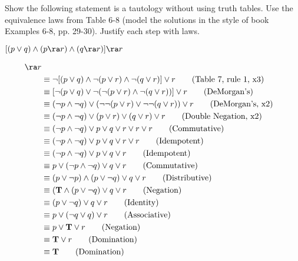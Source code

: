 \begin{questions}
 Show the following statement is a tautology without using truth tables. Use the equivalence laws from Table 6-8 (model the solutions in the style of book Examples 6-8, pp. 29-30).  Justify each step with laws.
\begin{center}
    $[(p \vee q) \wedge (p \ra r) \wedge (q \ra r)] \ra r$
\end{center}
    \begin{solution}
    \begin{align*}
      [(p \vee q) &\wedge ((p \ra r) \wedge (q \ra r))] \ra r \\
      &\equiv \neg[(p \vee q) \wedge \neg(p \vee r) \wedge \neg (q \vee r)] \vee r \tag{Table 7, rule 1, x3} \\
      &\equiv [\neg(p \vee q) \vee \neg(\neg(p \vee r) \wedge \neg(q \vee r))] \vee r \tag{DeMorgan's} \\
      & \equiv (\neg p \wedge \neg q) \vee (\neg \neg(p \vee r) \vee \neg \neg(q \vee r)) \vee r \tag{DeMorgan's, x2} \\
      & \equiv (\neg p \wedge \neg q) \vee (p \vee r) \vee (q \vee r) \vee r \tag{Double Negation, x2} \\
      & \equiv (\neg p \wedge \neg q) \vee p \vee q \vee r \vee r \vee r \tag{Commutative} \\
      & \equiv (\neg p \wedge \neg q) \vee p \vee q \vee r \vee r \tag{Idempotent} \\
      & \equiv (\neg p \wedge \neg q) \vee p \vee q \vee r \tag{Idempotent} \\
      & \equiv p \vee (\neg p \wedge \neg q) \vee q \vee r \tag{Commutative} \\
      & \equiv (p \vee \neg p) \wedge (p \vee \neg q) \vee q \vee r \tag{Distributive} \\
      & \equiv (\mathbf{T} \wedge (p \vee \neg q) \vee q \vee r \tag{Negation} \\
      & \equiv (p \vee \neg q) \vee q \vee r \tag{Identity} \\
      & \equiv p \vee (\neg q \vee q) \vee r \tag{Associative} \\
      & \equiv p \vee \mathbf{T} \vee r \tag{Negation} \\
      & \equiv \mathbf{T} \vee r \tag{Domination} \\
      & \equiv \mathbf{T} \tag{Domination}
    \end{align*}


\end{solution}
\end{questions}
